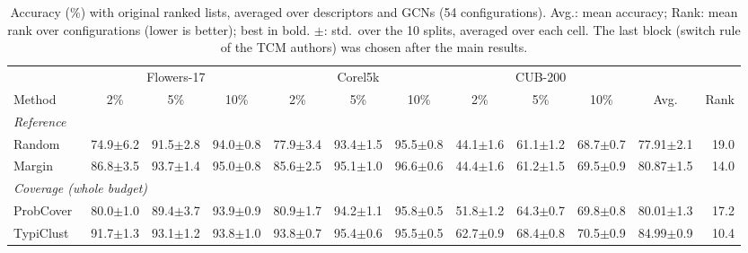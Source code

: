 \begin{table}[t]
\centering
\caption{Accuracy (\%) with original ranked lists, averaged over descriptors and GCNs (54 configurations). Avg.: mean accuracy; Rank: mean rank over configurations (lower is better); best in bold. $\pm$: std.\ over the 10 splits, averaged over each cell. The last block (switch rule of the TCM authors) was chosen after the main results.}
\label{tab:sota-none-std}
\footnotesize
\setlength{\tabcolsep}{3.5pt}
\begin{adjustbox}{max width=\textwidth}
\begin{tabular}{lrrrrrrrrrrr}
\toprule
& \multicolumn{3}{c}{Flowers-17} & \multicolumn{3}{c}{Corel5k} & \multicolumn{3}{c}{CUB-200} & & \\
\cmidrule(lr){2-4}\cmidrule(lr){5-7}\cmidrule(lr){8-10}
Method & \multicolumn{1}{c}{2\%} & \multicolumn{1}{c}{5\%} & \multicolumn{1}{c}{10\%} & \multicolumn{1}{c}{2\%} & \multicolumn{1}{c}{5\%} & \multicolumn{1}{c}{10\%} & \multicolumn{1}{c}{2\%} & \multicolumn{1}{c}{5\%} & \multicolumn{1}{c}{10\%} & \multicolumn{1}{c}{Avg.} & \multicolumn{1}{c}{Rank} \\
\midrule
\multicolumn{12}{l}{\textit{Reference}} \\
\quad Random & 74.9{\scriptsize$\pm$6.2} & 91.5{\scriptsize$\pm$2.8} & 94.0{\scriptsize$\pm$0.8} & 77.9{\scriptsize$\pm$3.4} & 93.4{\scriptsize$\pm$1.5} & 95.5{\scriptsize$\pm$0.8} & 44.1{\scriptsize$\pm$1.6} & 61.1{\scriptsize$\pm$1.2} & 68.7{\scriptsize$\pm$0.7} & 77.91{\scriptsize$\pm$2.1} & 19.0 \\
\quad Margin~\cite{scheffer2001active} & 86.8{\scriptsize$\pm$3.5} & 93.7{\scriptsize$\pm$1.4} & 95.0{\scriptsize$\pm$0.8} & 85.6{\scriptsize$\pm$2.5} & 95.1{\scriptsize$\pm$1.0} & 96.6{\scriptsize$\pm$0.6} & 44.4{\scriptsize$\pm$1.6} & 61.2{\scriptsize$\pm$1.5} & 69.5{\scriptsize$\pm$0.9} & 80.87{\scriptsize$\pm$1.5} & 14.0 \\
\multicolumn{12}{l}{\textit{Coverage (whole budget)}} \\
\quad ProbCover~\cite{yehuda2022active} & 80.0{\scriptsize$\pm$1.0} & 89.4{\scriptsize$\pm$3.7} & 93.9{\scriptsize$\pm$0.9} & 80.9{\scriptsize$\pm$1.7} & 94.2{\scriptsize$\pm$1.1} & 95.8{\scriptsize$\pm$0.5} & 51.8{\scriptsize$\pm$1.2} & 64.3{\scriptsize$\pm$0.7} & 69.8{\scriptsize$\pm$0.8} & 80.01{\scriptsize$\pm$1.3} & 17.2 \\
\quad TypiClust~\cite{hacohen2022active} & 91.7{\scriptsize$\pm$1.3} & 93.1{\scriptsize$\pm$1.2} & 93.8{\scriptsize$\pm$1.0} & 93.8{\scriptsize$\pm$0.7} & 95.4{\scriptsize$\pm$0.6} & 95.5{\scriptsize$\pm$0.5} & 62.7{\scriptsize$\pm$0.9} & 68.4{\scriptsize$\pm$0.8} & 70.5{\scriptsize$\pm$0.9} & 84.99{\scriptsize$\pm$0.9} & 10.4 \\

\end{tabular}
\end{adjustbox}
\end{table}

